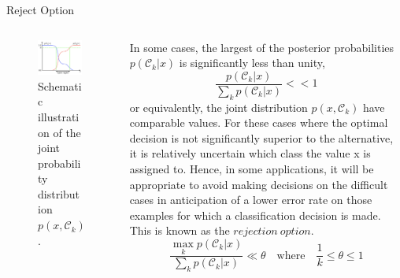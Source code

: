 \documentclass{bredelebeamer}
\begin{document}
\begin{frame}{Reject Option}
  \begin{columns}
    \begin{column}{0.3\textwidth}
      \begin{figure}
      \centering
      \includegraphics[scale=0.15]{classification_rejection_option.png}
      \caption{
        Schematic illustration of the joint probability distribution $p(x,\mathcal{C}_k)$.
      }
      \end{figure}
    \end{column}
    \begin{column}{0.7\textwidth}
      \begin{justify}
        In some cases, the largest of the posterior probabilities $p(\mathcal{C}_k|x)$
        is significantly less than unity,
        \begin{equation}
          \frac{p(\mathcal{C}_k|x)}{\sum_{k} p(\mathcal{C}_k|x)} << 1
        \end{equation}
        or equivalently, the joint distribution $p(x,\mathcal{C}_k)$ have comparable values.
        For these cases where the optimal decision is not significantly superior to
        the alternative, it is relatively uncertain which class the value x is assigned to.
        Hence, in some applications, it will be appropriate to avoid making decisions
        on the difficult cases in anticipation of a lower error rate on those examples
        for which a classification decision is made. This is known as the
        $\mathit{rejection\ option}$.
        \begin{equation}
          \frac{\max_k p(\mathcal{C}_k|x)}{\sum_{k} p(\mathcal{C}_k|x)} \ll \theta
          \quad \mathrm{where} \quad \frac{1}{k} \leq \theta \leq 1
        \end{equation}
      \end{justify}
    \end{column}
  \end{columns}
\end{frame}
\end{document}

